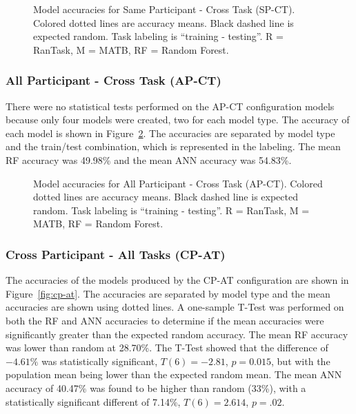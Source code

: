 \documentclass[11pt]{article}
\begin{document}
		\begin{figure}
		\centering
		\caption[Same Participant - Cross Task (SP-CT) Model Accuracies]{ Model accuracies for Same Participant - Cross Task (SP-CT). Colored dotted lines are accuracy means. Black dashed line is expected random. Task labeling is ``training - testing''. R = RanTask, M = MATB, RF = Random Forest. }
		\label{fig:sp-ct}
		\end{figure} 
		
		\subsubsection{All Participant - Cross Task (AP-CT)}
		There were no statistical tests performed on the AP-CT configuration models because only four models were created, two for each model type. The accuracy of each model is shown in Figure~\ref{fig:ap-ct}. The accuracies are separated by model type and the train/test combination, which is represented in the labeling. The mean RF accuracy was 49.98\% and the mean ANN accuracy was 54.83\%.
		
		\begin{figure}
		\centering
		\caption[All Participant - Cross Task (AP-CT) Model Accuracies]{ Model accuracies for All Participant - Cross Task (AP-CT). Colored dotted lines are accuracy means. Black dashed line is expected random. Task labeling is ``training - testing''. R = RanTask, M = MATB, RF = Random Forest. }
		\label{fig:ap-ct}
		\end{figure} 
		
		\subsubsection{Cross Participant - All Tasks (CP-AT)}
		The accuracies of the models produced by the CP-AT configuration are shown in Figure~\ref{fig:cp-at}. The accuracies are separated by model type and the mean accuracies are shown using dotted lines. A one-sample T-Test was performed on both the RF and ANN accuracies to determine if the mean accuracies were significantly greater than the expected random accuracy. The mean RF accuracy was lower than random at 28.70\%. The T-Test showed that the difference of \(-4.61\%\) was statistically significant, \(T(6) = -2.81\), \(p = 0.015\), but with the population mean being lower than the expected random mean. The mean ANN accuracy of 40.47\% was found to be higher than random (33\%), with a statistically significant different of 7.14\%, \(T(6) = 2.614\), \(p = .02\).
		
\end{document}
